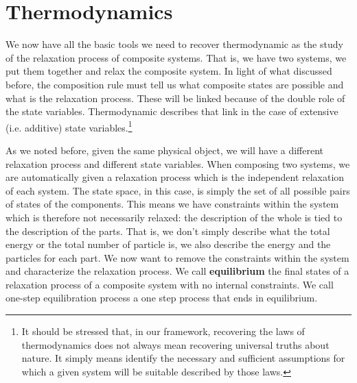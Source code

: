 \documentclass[letterpaper]{article}
\begin{document}
\section{Thermodynamics}

We now have all the basic tools we need to recover thermodynamic as the study of the relaxation process of composite systems. That is, we have two systems, we put them together and relax the composite system. In light of what discussed before, the composition rule must tell us what composite states are possible and what is the relaxation process. These will be linked because of the double role of the state variables. Thermodynamic describes that link in the case of extensive (i.e. additive) state variables.\footnote{It should be stressed that, in our framework, recovering the laws of thermodynamics does not always mean recovering universal truths about nature. It simply means identify the necessary and sufficient assumptions for which a given system will be suitable described by those laws.}

As we noted before, given the same physical object, we will have a different relaxation process and different state variables. When composing two systems, we are automatically given a relaxation process which is the independent relaxation of each system. The state space, in this case, is simply the set of all possible pairs of states of the components. This means we have constraints within the system which is therefore not necessarily relaxed: the description of the whole is tied to the description of the parts. That is, we don't simply describe what the total energy or the total number of particle is, we also describe the energy and the particles for each part. We now want to remove the constraints within the system and characterize the relaxation process. We call \textbf{equilibrium} the final states of a relaxation process of a composite system with no internal constraints. We call one-step equilibration process a one step process that ends in equilibrium.
\end{document}
